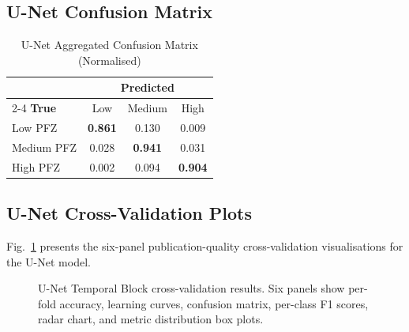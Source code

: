 \documentclass[conference]{IEEEtran}
\begin{document}
\subsection{U-Net Confusion Matrix}

\begin{table}[htbp]
\caption{U-Net Aggregated Confusion Matrix (Normalised)}
\label{tab:unet_cm}
\centering
\begin{tabular}{lccc}
\toprule
& \multicolumn{3}{c}{\textbf{Predicted}} \\
\cmidrule(lr){2-4}
\textbf{True} & Low & Medium & High\\
\midrule
Low PFZ    & \textbf{0.861} & 0.130 & 0.009\\
Medium PFZ & 0.028 & \textbf{0.941} & 0.031\\
High PFZ   & 0.002 & 0.094 & \textbf{0.904}\\
\bottomrule
\end{tabular}
\end{table}

\subsection{U-Net Cross-Validation Plots}

Fig.~\ref{fig:unet_cv_plots} presents the six-panel publication-quality
cross-validation visualisations for the U-Net model.

\begin{figure}[htbp]
\centering
\caption{U-Net Temporal Block cross-validation results. Six panels show
per-fold accuracy, learning curves, confusion matrix, per-class F1
scores, radar chart, and metric distribution box plots.}
\label{fig:unet_cv_plots}
\end{figure}
\end{document}
